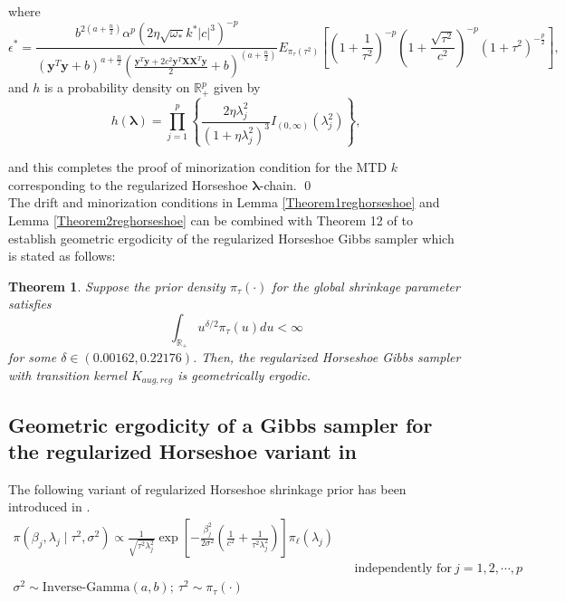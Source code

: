 \documentclass[noinfoline,11pt]{imsart}
\numberwithin{equation}{section}
\theoremstyle{plain}
\newtheorem{thm}{Theorem}[section]
\newcommand{\y}{\mathbf{y}}
\newcommand{\X}{\mathbf{X}}
\newcommand{\bl}{\boldsymbol{\lambda}}
\newcommand\Myciteauthor[1]{\citeauthor{#1} \cite{#1}}
\begin{document}
\noindent
where
$$\epsilon^*= \frac{b^{2\left(a+\frac{n}{2}\right)}\alpha^p\left(2\eta\sqrt{\omega_*}k^*|c|^3\right)^{-p}}{\left(\y^T\y+b\right)^{a+\frac{n}{2}}\left(\frac{\y^T\y+2c^2\y^T\X\X^T\y}{2}+b\right)^{\left(a+\frac{n}{2}\right)}} E_{\pi_\tau\left(\tau^2\right)}\left[\left(1+\frac{1}{\tau^2}\right)^{-p} \left(1+\frac{\sqrt{\tau^2}}{c^2}\right)^{-p}\left(1+\tau^2\right)^{-\frac{p}{2}}\right],$$
and $h$ is a probability density on $\mathbb{R}^p_+$ given by $$h\left(\bl\right)= \prod\limits_{j=1}^p\left\{\frac{2\eta\lambda_j^2}{\left(1+\eta\lambda_j^2\right)^3}I_{(0,\infty)}\left(\lambda_j^2\right)\right\},$$ 

\noindent
and this completes the proof of minorization condition for the MTD $k$ corresponding to the regularized Horseshoe $\bl$-chain. \qed \\
The drift and minorization conditions in Lemma \ref{Theorem1reghorseshoe} and Lemma \ref{Theorem2reghorseshoe} can be combined with Theorem 12 of \Myciteauthor{10.2307/2291067} to establish geometric ergodicity of the regularized Horseshoe Gibbs sampler which is stated as follows:

\begin{thm} \label{thm:regularized:Horseshoe:Piironen:Vehtari}
Suppose the prior density $\pi_\tau (\cdot)$ for the global shrinkage parameter satisfies 
$$\int_{\mathbb{R}_+} u^{\delta/2} \pi_\tau (u) du < \infty$$ for some $\delta \in (0.00162, 0.22176)$. 
Then, the regularized Horseshoe Gibbs sampler with transition kernel $K_{aug,reg}$
is geometrically ergodic.
\end{thm}

\subsection{Geometric ergodicity of a Gibbs sampler for the regularized Horseshoe 
variant in \Myciteauthor{nishimura2019shrinkage}} \label{regularized:Horseshoe:Nishimura:Suchard}
The following variant of regularized Horseshoe shrinkage prior has been introduced in \Myciteauthor{nishimura2019shrinkage}. 
\begin{eqnarray}\label{Nishimurahorseshoepriors}
\pi\left(\beta_j, \lambda_j \mid \tau^2,\sigma^2\right)\propto \frac{1}{\sqrt{\tau^2\lambda_j^2}}\exp{\left[-\frac{\beta_j^2}{2\sigma^2}\left(\frac{1}{c^2}+\frac{1}{\tau^2\lambda_j^2}\right)\right]}\pi_\ell\left(\lambda_j\right) \nonumber\\
& & \text{independently for}\ j=1,2,\cdots,p \nonumber \\
\sigma^2\sim\text{Inverse-Gamma}\left(a,b\right);\ \tau^2\sim\pi_\tau\left(\cdot\right) 
\end{eqnarray}
\end{document}
